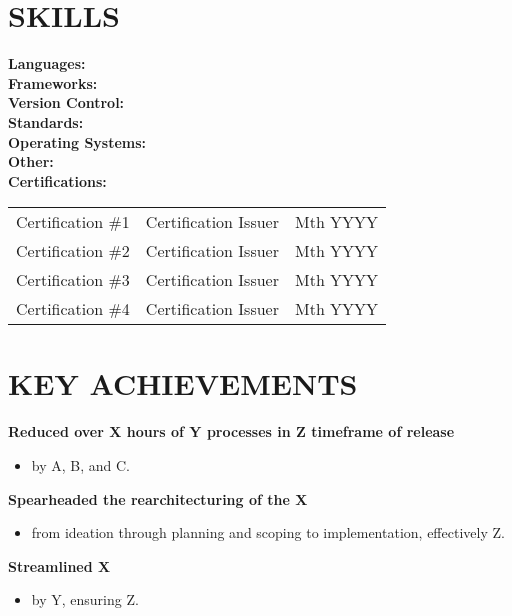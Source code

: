 \documentclass[11pt,letterpaper]{article}
\newcommand{\subheading}[3]{
    \textbf{#1}{#2 }{\hfill #3 \vspace{-2pt}}
}
\begin{document}
\section*{SKILLS}
\textbf{Languages:} \\
\textbf{Frameworks:}  \\
\textbf{Version Control:}  \\
\textbf{Standards:}  \\
\textbf{Operating Systems:}  \\
\textbf{Other:}    \\
\textbf{Certifications:} \\
\vspace*{3pt}
\begin{tabular}{l | l | l}
  Certification \#1        & Certification Issuer          & Mth  YYYY \\
  Certification \#2     & Certification Issuer          & Mth  YYYY \\
  Certification \#3              & Certification Issuer & Mth  YYYY \\
  Certification \#4 & Certification Issuer & Mth  YYYY \\
\end{tabular}

\vspace{-15pt}

\section*{KEY ACHIEVEMENTS}
\subheading{Reduced over X hours of Y processes in Z timeframe of release}{}{} \\
\vspace{-8pt}
\begin{itemize}
  \item by A, B, and C.
\end{itemize}
\vspace*{-10pt}
\subheading{Spearheaded the rearchitecturing of the X}{ }{ } \\
\vspace{-8pt}
\begin{itemize}
  \item  from ideation through planning and scoping to implementation, effectively Z.
\end{itemize}
\vspace{-10pt}
\subheading{Streamlined X}{}{} \\
\vspace{-8pt}
\begin{itemize}
  \item by Y, ensuring Z.
\end{itemize}
\vspace*{-20pt}
\end{document}
